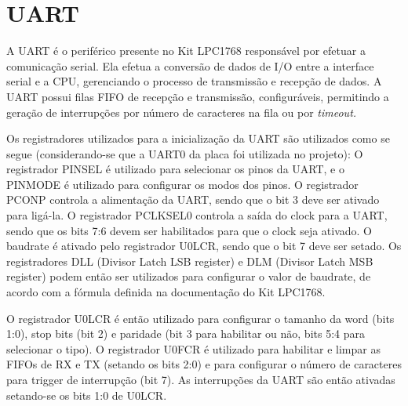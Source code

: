 
\section{UART}

A UART é o periférico presente no Kit LPC1768 responsável por efetuar a comunicação serial. Ela efetua a conversão de dados de I/O entre a interface serial e a CPU, gerenciando o processo de transmissão e recepção de dados. A UART possui filas FIFO de recepção e transmissão, configuráveis, permitindo a geração de interrupções por número de caracteres na fila ou por \it{timeout}. 

Os registradores utilizados para a inicialização da UART são utilizados como se segue (considerando-se que a UART0 da placa foi utilizada no projeto): O registrador PINSEL é utilizado para selecionar os pinos da UART, e o PINMODE é utilizado para configurar os modos dos pinos. O registrador PCONP controla a alimentação da UART, sendo que o bit 3 deve ser ativado para ligá-la. O registrador PCLKSEL0 controla a saída do clock para a UART, sendo que os bits 7:6 devem ser habilitados para que o clock seja ativado. O baudrate é ativado pelo registrador U0LCR, sendo que o bit 7 deve ser setado. Os registradores DLL (Divisor Latch LSB register) e DLM (Divisor Latch MSB register) podem então ser utilizados para configurar o valor de baudrate, de acordo com a fórmula definida na documentação do Kit LPC1768. 

O registrador U0LCR é então utilizado para configurar o tamanho da word (bits 1:0), stop bits (bit 2) e paridade (bit 3 para habilitar ou não, bits 5:4 para selecionar o tipo). O registrador U0FCR é utilizado para habilitar e limpar as FIFOs de RX e TX (setando os bits 2:0) e para configurar o número de caracteres para trigger de interrupção (bit 7). As interrupções da UART são então ativadas setando-se os bits 1:0 de U0LCR.
